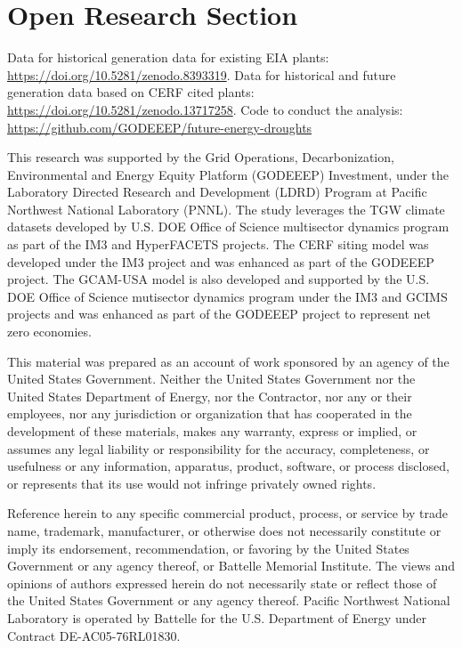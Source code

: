 \documentclass{agujournal2019}
\begin{document}
 


%
%

\section*{Open Research Section}
Data for historical generation data for existing EIA plants: \url{https://doi.org/10.5281/zenodo.8393319}. Data for historical and future generation data based on CERF cited plants: \url{https://doi.org/10.5281/zenodo.13717258}. Code to conduct the analysis: \url{https://github.com/GODEEEP/future-energy-droughts}


\acknowledgments
This research was supported by the Grid Operations, Decarbonization, Environmental and Energy Equity Platform (GODEEEP) Investment, under the Laboratory Directed Research and Development (LDRD) Program at Pacific Northwest National Laboratory (PNNL). The study leverages the TGW climate datasets developed by U.S. DOE Office of Science multisector dynamics program as part of the IM3 and HyperFACETS projects. The CERF siting model was developed under the IM3 project and was enhanced as part of the GODEEEP project. The GCAM-USA model is also developed and supported by the U.S. DOE Office of Science mutisector dynamics program under the IM3 and GCIMS projects and was enhanced as part of the GODEEEP project to represent net zero economies. 

This material was prepared as an account of work sponsored by an agency of the United States Government.  Neither the United States Government nor the United States Department of Energy, nor the Contractor, nor any or their employees, nor any jurisdiction or organization that has cooperated in the development of these materials, makes any warranty, express or implied, or assumes any legal liability or responsibility for the accuracy, completeness, or usefulness or any information, apparatus, product, software, or process disclosed, or represents that its use would not infringe privately owned rights.

Reference herein to any specific commercial product, process, or service by trade name, trademark, manufacturer, or otherwise does not necessarily constitute or imply its endorsement, recommendation, or favoring by the United States Government or any agency thereof, or Battelle Memorial Institute. The views and opinions of authors expressed herein do not necessarily state or reflect those of the United States Government or any agency thereof.  Pacific Northwest National Laboratory is operated by Battelle for the U.S. Department of Energy under Contract DE-AC05-76RL01830. 
\end{document}

